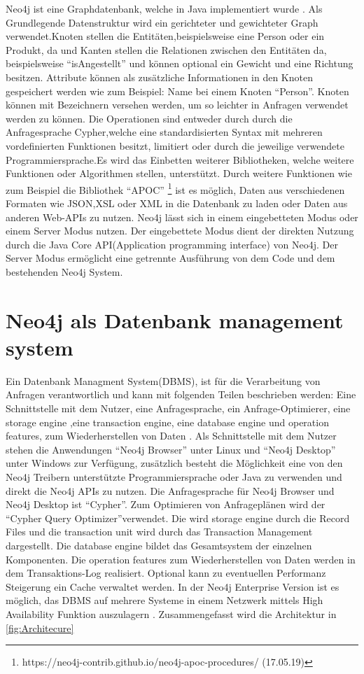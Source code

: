 Neo4j ist eine Graphdatenbank, welche in Java implementiert wurde \parencite{vukotic2015neo4j}. Als Grundlegende Datenstruktur wird ein gerichteter und gewichteter  Graph verwendet.Knoten stellen die Entitäten,beispielsweise eine Person oder ein Produkt,  da und  Kanten stellen die Relationen zwischen den Entitäten da, beispielsweise “isAngestellt” und können optional ein Gewicht und eine Richtung besitzen. Attribute können als zusätzliche Informationen in den Knoten gespeichert  werden wie zum Beispiel: Name bei einem Knoten “Person”. Knoten können mit Bezeichnern versehen werden, um so leichter in Anfragen  verwendet werden zu können. Die Operationen sind entweder durch durch die  Anfragesprache  Cypher,welche eine standardisierten Syntax mit  mehreren vordefinierten Funktionen besitzt, limitiert oder durch die jeweilige verwendete Programmiersprache.Es wird das Einbetten weiterer Bibliotheken, welche weitere Funktionen oder Algorithmen stellen, unterstützt. Durch weitere Funktionen wie zum Beispiel die Bibliothek “APOC” \footnote{https://neo4j-contrib.github.io/neo4j-apoc-procedures/ (17.05.19) } ist es möglich, Daten aus verschiedenen Formaten wie JSON,XSL oder XML in die Datenbank zu laden oder Daten aus anderen Web-APIs zu nutzen. Neo4j lässt sich in einem  eingebetteten Modus oder einem  Server Modus nutzen. Der eingebettete Modus dient der direkten  Nutzung durch die Java Core API(Application programming interface)  von Neo4j. Der Server Modus ermöglicht eine getrennte Ausführung von dem Code und dem bestehenden Neo4j System.

\section{Neo4j als Datenbank management system}
Ein Datenbank Managment System(DBMS), ist für die Verarbeitung von Anfragen verantwortlich und kann mit folgenden Teilen beschrieben werden: Eine Schnittstelle mit dem Nutzer, eine Anfragesprache, ein Anfrage-Optimierer, eine storage engine ,eine transaction engine, eine database engine und operation features, zum Wiederherstellen von Daten \parencite{angles2012comparison}. Als Schnittstelle mit dem Nutzer stehen die Anwendungen “Neo4j Browser” unter Linux und “Neo4j Desktop” unter Windows zur Verfügung, zusätzlich besteht die Möglichkeit eine von den Neo4j Treibern unterstützte Programmiersprache  oder Java zu verwenden und direkt die Neo4j APIs zu nutzen. Die Anfragesprache für Neo4j Browser und Neo4j Desktop ist “Cypher”. Zum Optimieren von Anfrageplänen wird der “Cypher Query Optimizer”verwendet. Die wird storage engine durch die Record Files und die transaction unit  wird durch das Transaction Management dargestellt. Die database engine bildet das Gesamtsystem der einzelnen Komponenten. Die operation features zum Wiederherstellen von Daten werden in dem Transaktions-Log realisiert. Optional kann zu eventuellen Performanz Steigerung ein Cache verwaltet werden. In der Neo4j Enterprise Version ist es möglich, das DBMS auf mehrere Systeme in einem Netzwerk mittels High Availability Funktion auszulagern \parencite{vukotic2015neo4j}. Zusammengefasst wird die Architektur in \ref{fig:Architecure}

